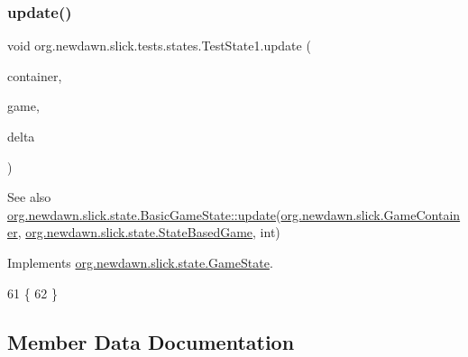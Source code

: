 \subsubsection{\texorpdfstring{update()}{update()}}
{\footnotesize\ttfamily void org.\+newdawn.\+slick.\+tests.\+states.\+Test\+State1.\+update (\begin{DoxyParamCaption}\item[{\mbox{\hyperlink{classorg_1_1newdawn_1_1slick_1_1_game_container}{Game\+Container}}}]{container,  }\item[{\mbox{\hyperlink{classorg_1_1newdawn_1_1slick_1_1state_1_1_state_based_game}{State\+Based\+Game}}}]{game,  }\item[{int}]{delta }\end{DoxyParamCaption})\hspace{0.3cm}{\ttfamily [inline]}}

\begin{DoxySeeAlso}{See also}
\mbox{\hyperlink{interfaceorg_1_1newdawn_1_1slick_1_1state_1_1_game_state_ab5ec3bc37a9bd1eb5679577408c562c1}{org.\+newdawn.\+slick.\+state.\+Basic\+Game\+State\+::update}}(\mbox{\hyperlink{classorg_1_1newdawn_1_1slick_1_1_game_container}{org.\+newdawn.\+slick.\+Game\+Container}}, \mbox{\hyperlink{classorg_1_1newdawn_1_1slick_1_1state_1_1_state_based_game}{org.\+newdawn.\+slick.\+state.\+State\+Based\+Game}}, int) 
\end{DoxySeeAlso}


Implements \mbox{\hyperlink{interfaceorg_1_1newdawn_1_1slick_1_1state_1_1_game_state_ab5ec3bc37a9bd1eb5679577408c562c1}{org.\+newdawn.\+slick.\+state.\+Game\+State}}.


\begin{DoxyCode}
61                                                                                 \{
62     \}
\end{DoxyCode}


\subsection{Member Data Documentation}
\mbox{\label{classorg_1_1newdawn_1_1slick_1_1tests_1_1states_1_1_test_state1_aa468e72bb425e9f217e3580c6bfae716}} 
